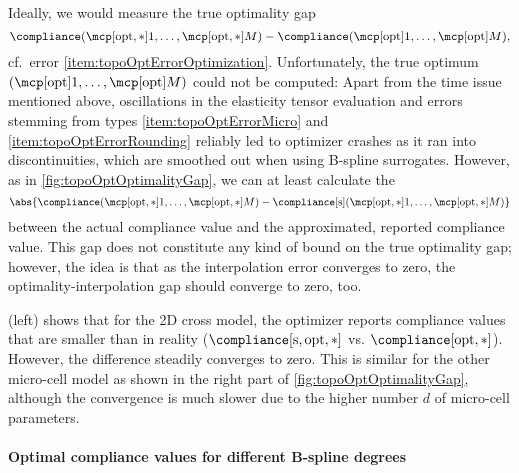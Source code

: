 Ideally, we would measure the true optimality gap
\begin{equation}
  \label{eq:topoOptOptimalityGapTrue}
  \compliance(\mcpoptappr{1}, \dotsc, \mcpoptappr{M}) -
  \compliance(\mcpopt{1}, \dotsc, \mcpopt{M}),
\end{equation}
cf.\ error \ref{item:topoOptErrorOptimization}.
Unfortunately, the true optimum
$(\mcpopt{1}, \dotsc, \mcpopt{M})$ could not be computed:
Apart from the time issue mentioned above,
oscillations in the elasticity tensor evaluation and
errors stemming from types
\ref{item:topoOptErrorMicro} and \ref{item:topoOptErrorRounding}
reliably led to optimizer crashes as it ran into discontinuities,
which are smoothed out when using B-spline surrogates.
However, as in \cref{fig:topoOptOptimalityGap},
we can at least calculate the 
\begin{equation}
  \label{eq:topoOptOptimalityGapPseudo}
  \abs{
    \compliance(\mcpoptappr{1}, \dotsc, \mcpoptappr{M}) -
    \complianceintp(\mcpoptappr{1}, \dotsc, \mcpoptappr{M})
  }
\end{equation}
between the actual compliance value
and the approximated, reported compliance value.
This gap does not constitute any kind of bound on the true optimality gap;
however, the idea is that
as the interpolation error converges to zero,
the optimality-interpolation gap should converge to zero, too.

\pagebreak

 (left) shows that for the 2D cross model,
the optimizer reports compliance values that are smaller than in reality
($\complianceintp[\opt,\ast]$ vs. $\compliance[\opt,\ast]$).
However, the difference steadily converges to zero.
This is similar for the other micro-cell model as shown in the
right part of \cref{fig:topoOptOptimalityGap},
although the convergence is much slower due to the
higher number $d$ of micro-cell parameters.

\paragraph{Optimal compliance values for different B-spline degrees}

